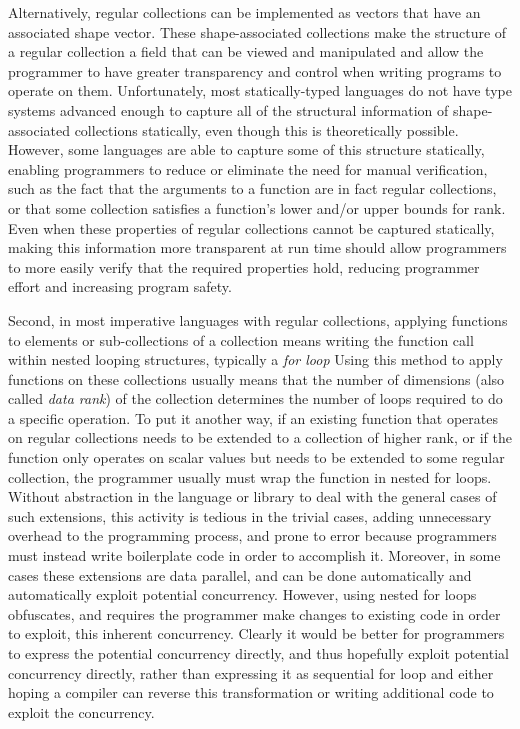 Alternatively, regular collections can be implemented as vectors that have an associated shape vector. 
These shape-associated collections make the structure of a regular collection 
a field that can be viewed and manipulated and allow the programmer to have 
greater transparency and control when writing programs to operate on them.
Unfortunately, most statically-typed languages do not have type systems advanced enough 
to capture all of the structural information of shape-associated collections statically, 
even though this is theoretically possible. %
However, some languages are able to capture some of this structure statically, 
enabling programmers to reduce or eliminate the need for manual verification, 
such as the fact that the arguments to a function are in fact regular collections,
or that some collection satisfies a function's lower and/or upper bounds for rank\cite{boost}\cite{sac}\cite{dph}.
Even when these properties of regular collections cannot be captured statically, 
making this information more transparent at run time 
should allow programmers to more easily verify that the required properties hold, 
reducing programmer effort and increasing program safety.

Second, in most imperative languages with regular collections, 
applying functions to elements or sub-collections of a collection means 
writing the function call within nested looping structures, typically a \textit{for loop}
Using this method to apply functions on these collections usually means that 
the number of dimensions (also called \textit{data rank}) of the collection 
determines the number of loops required to do a specific operation.
To put it another way, if an existing function that operates on regular collections 
needs to be extended to a collection of higher rank, 
or if the function only operates on scalar values but needs to be extended to some regular collection, 
the programmer usually must wrap the function in nested for loops.
Without abstraction in the language or library to deal with the general cases of such extensions, 
this activity is tedious in the trivial cases, adding unnecessary overhead to the programming process,
and prone to error because programmers must instead write boilerplate code in order to accomplish it.
Moreover, in some cases these extensions are data parallel, 
and can be done automatically and automatically exploit potential concurrency.
However, using nested for loops obfuscates,
and requires the programmer make changes to existing code in order to exploit, this inherent concurrency. 
Clearly it would be better for programmers to express the potential concurrency directly, 
and thus hopefully exploit potential concurrency directly, 
rather than expressing it as sequential for loop and either hoping a compiler can reverse this transformation 
or writing additional code to exploit the concurrency.

